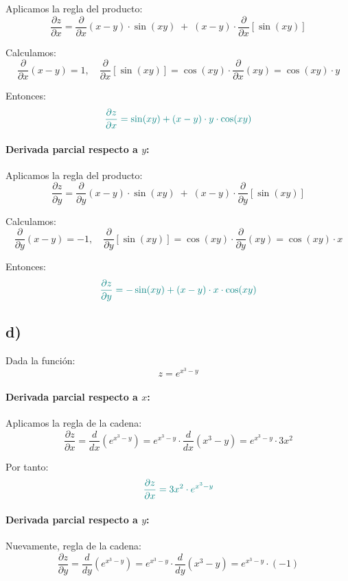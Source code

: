 \documentclass{article}
\begin{document}
Aplicamos la regla del producto:
\[
\frac{\partial z}{\partial x}
= \frac{\partial}{\partial x}(x - y) \cdot \sin(xy)
\;+\; (x - y) \cdot \frac{\partial}{\partial x}[\sin(xy)]
\]

Calculamos:
\[
\frac{\partial}{\partial x}(x - y) = 1,
\quad
\frac{\partial}{\partial x}[\sin(xy)] = \cos(xy) \cdot \frac{\partial}{\partial x}(xy) = \cos(xy)\cdot y
\]

Entonces:
\[
\color{teal}
\frac{\partial z}{\partial x}
= \sin(xy) + (x - y)\cdot y \cdot \cos(xy)
\]

\paragraph{Derivada parcial respecto a \(y\):}

Aplicamos la regla del producto:
\[
\frac{\partial z}{\partial y}
= \frac{\partial}{\partial y}(x - y) \cdot \sin(xy)
\;+\; (x - y) \cdot \frac{\partial}{\partial y}[\sin(xy)]
\]

Calculamos:
\[
\frac{\partial}{\partial y}(x - y) = -1,
\quad
\frac{\partial}{\partial y}[\sin(xy)] = \cos(xy)\cdot \frac{\partial}{\partial y}(xy) = \cos(xy)\cdot x
\]

Entonces:
\[
\color{teal}
\frac{\partial z}{\partial y}
= -\sin(xy) + (x - y)\cdot x \cdot \cos(xy)
\]


\subsection*{d)}
Dada la función:
\[
z = e^{x^3 - y}
\]

\paragraph{Derivada parcial respecto a \(x\):}

Aplicamos la regla de la cadena:
\[
\frac{\partial z}{\partial x}
= \frac{d}{dx}\left(e^{x^3 - y}\right)
= e^{x^3 - y} \cdot \frac{d}{dx}(x^3 - y)
= e^{x^3 - y} \cdot 3x^2
\]

Por tanto:
\[
\color{teal}
\frac{\partial z}{\partial x}
= 3x^2 \cdot e^{x^3 - y}
\]

\paragraph{Derivada parcial respecto a \(y\):}

Nuevamente, regla de la cadena:
\[
\frac{\partial z}{\partial y}
= \frac{d}{dy}\left(e^{x^3 - y}\right)
= e^{x^3 - y} \cdot \frac{d}{dy}(x^3 - y)
= e^{x^3 - y} \cdot (-1)
\]
\end{document}
